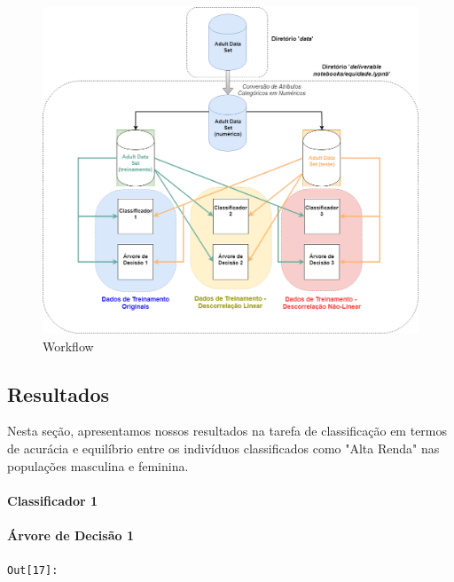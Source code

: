 \documentclass[11pt]{article}
\makeatletter
\def\maxwidth{\ifdim\Gin@nat@width>\linewidth\linewidth
    \else\Gin@nat@width\fi}
\let\Oldincludegraphics\includegraphics
\renewcommand{\includegraphics}[1]{\Oldincludegraphics[width=.8\maxwidth]{#1}}
\makeatother
\begin{document}
\begin{figure}
\centering
\includegraphics{../fig/WorkflowIA369.png}
\caption{Workflow}
\end{figure}

    \subsection{Resultados}\label{resultados}

Nesta seção, apresentamos nossos resultados na tarefa de classificação
em termos de acurácia e equilíbrio entre os indivíduos classificados
como "Alta Renda" nas populações masculina e feminina.

    \paragraph{Classificador 1}\label{classificador-1}

    \paragraph{Árvore de Decisão 1}\label{uxe1rvore-de-decisuxe3o-1}
\texttt{\color{outcolor}Out[{\color{outcolor}17}]:}
    
    \begin{center}
    \end{center}
    { \hspace*{\fill} \\}
    
\end{document}
